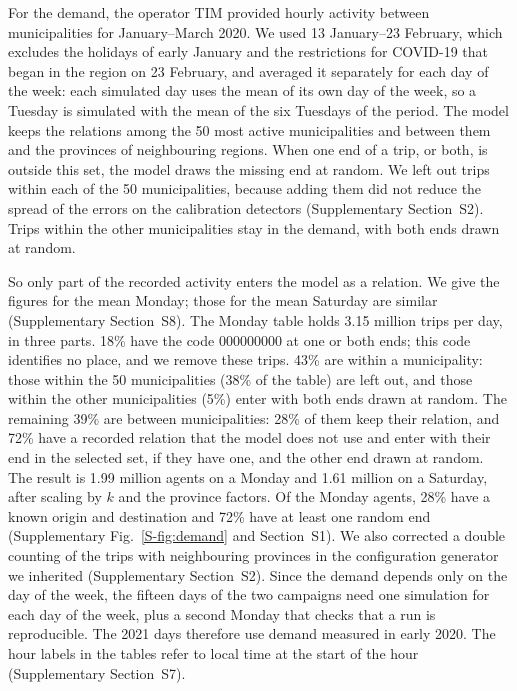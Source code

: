 \documentclass[preprint,11pt,a4paper]{elsarticle}
\begin{document}
For the demand, the operator TIM provided hourly activity between municipalities for January--March 2020. We used 13 January--23 February, which excludes the holidays of early January and the restrictions for COVID-19 that began in the region on 23 February, and averaged it separately for each day of the week: each simulated day uses the mean of its own day of the week, so a Tuesday is simulated with the mean of the six Tuesdays of the period. The model keeps the relations among the 50 most active municipalities and between them and the provinces of neighbouring regions. When one end of a trip, or both, is outside this set, the model draws the missing end at random. We left out trips within each of the 50 municipalities, because adding them did not reduce the spread of the errors on the calibration detectors (Supplementary Section~S2). Trips within the other municipalities stay in the demand, with both ends drawn at random.

So only part of the recorded activity enters the model as a relation. We give the figures for the mean Monday; those for the mean Saturday are similar (Supplementary Section~S8). The Monday table holds 3.15 million trips per day, in three parts. 18\% have the code 000000000 at one or both ends; this code identifies no place, and we remove these trips. 43\% are within a municipality: those within the 50 municipalities (38\% of the table) are left out, and those within the other municipalities (5\%) enter with both ends drawn at random. The remaining 39\% are between municipalities: 28\% of them keep their relation, and 72\% have a recorded relation that the model does not use and enter with their end in the selected set, if they have one, and the other end drawn at random. The result is 1.99 million agents on a Monday and 1.61 million on a Saturday, after scaling by $k$ and the province factors. Of the Monday agents, 28\% have a known origin and destination and 72\% have at least one random end (Supplementary Fig.~\ref{S-fig:demand} and Section~S1). We also corrected a double counting of the trips with neighbouring provinces in the configuration generator we inherited (Supplementary Section~S2). Since the demand depends only on the day of the week, the fifteen days of the two campaigns need one simulation for each day of the week, plus a second Monday that checks that a run is reproducible. The 2021 days therefore use demand measured in early 2020. The hour labels in the tables refer to local time at the start of the hour (Supplementary Section~S7).
\end{document}
